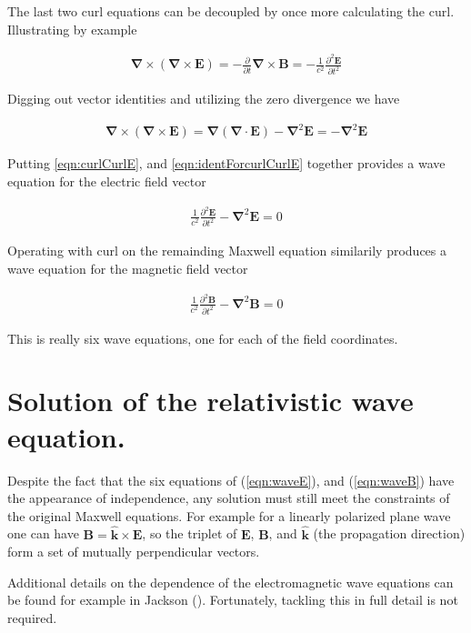 \documentclass[]{eliblog}
\newcommand{\BB}[0]{\mathbf{B}}
\newcommand{\BE}[0]{\mathbf{E}}
\newcommand{\Bk}[0]{\mathbf{k}}
\newcommand{\cross}[0]{\times}
\newcommand{\spacegrad}[0]{\boldsymbol{\nabla}}
\newcommand{\inv}[1]{\frac{1}{#1}}
\newcommand{\kcap}[0]{\hat{\Bk}}
\begin{document}
The last two curl equations can be decoupled by once more calculating the curl.
Illustrating by example

\begin{align}\label{eqn:curlCurlE}
\spacegrad \cross (\spacegrad \cross \BE) = -\frac{\partial }{\partial t} \spacegrad \cross \BB = -\inv{c^2} \frac{\partial^2 \BE}{\partial t^2}
\end{align}

Digging out vector identities and utilizing the zero divergence we have

\begin{align}\label{eqn:identForcurlCurlE}
\spacegrad \cross (\spacegrad \cross \BE) = \spacegrad (\spacegrad \cdot \BE) - \spacegrad^2 \BE = -\spacegrad^2 \BE
\end{align}

Putting \ref{eqn:curlCurlE}, and \ref{eqn:identForcurlCurlE} together provides a wave equation for the electric field vector

\begin{align}\label{eqn:waveE}
\inv{c^2} \frac{\partial^2 \BE}{\partial t^2} - \spacegrad^2 \BE = 0
\end{align}

Operating with curl on the remainding Maxwell equation similarily produces a wave equation for the magnetic field vector

\begin{align}\label{eqn:waveB}
\inv{c^2} \frac{\partial^2 \BB}{\partial t^2} - \spacegrad^2 \BB = 0
\end{align}

This is really six wave equations, one for each of the field coordinates.

\section{Solution of the relativistic wave equation.}

Despite the fact that the six equations of (\ref{eqn:waveE}), and (\ref{eqn:waveB}) have the appearance of independence,
any solution must still meet the constraints of the original Maxwell equations.  For example for a linearly polarized
plane wave one can have $\BB = \kcap \cross \BE$, so the triplet of $\BE$, $\BB$, and $\kcap$ (the propagation direction) form a set 
of mutually perpendicular vectors.

Additional details on the dependence of the electromagnetic wave equations
can be found for example in Jackson (\cite{jackson1975cewWave}).  Fortunately, tackling this
in full detail is not required.  
\end{document}
